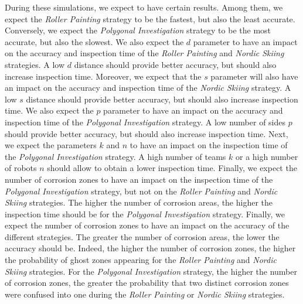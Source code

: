 During these simulations, we expect to have certain results.
Among them, we expect the \textit{Roller Painting} strategy to be the fastest, but also the least accurate.
Conversely, we expect the \textit{Polygonal Investigation} strategy to be the most accurate, but also the slowest.
We also expect the $d$ parameter to have an impact on the accuracy and inspection time of the \textit{Roller Painting} and \textit{Nordic Skiing} strategies.
A low $d$ distance should provide better accuracy, but should also increase inspection time.
Moreover, we expect that the $s$ parameter will also have an impact on the accuracy and inspection time of the \textit{Nordic Skiing} strategy.
A low $s$ distance should provide better accuracy, but should also increase inspection time.
We also expect the $p$ parameter to have an impact on the accuracy and inspection time of the \textit{Polygonal Investigation} strategy.
A low number of sides $p$ should provide better accuracy, but should also increase inspection time.
Next, we expect the parameters $k$ and $n$ to have an impact on the inspection time of the \textit{Polygonal Investigation} strategy.
A high number of teams $k$ or a high number of robots $n$ should allow to obtain a lower inspection time.
Finally, we expect the number of corrosion zones to have an impact on the inspection time of the \textit{Polygonal Investigation} strategy, but not on the \textit{Roller Painting} and \textit{Nordic Skiing} strategies.
The higher the number of corrosion areas, the higher the inspection time should be for the \textit{Polygonal Investigation} strategy.
Finally, we expect the number of corrosion zones to have an impact on the accuracy of the different strategies.
The greater the number of corrosion areas, the lower the accuracy should be.
Indeed, the higher the number of corrosion zones, the higher the probability of ghost zones appearing for the \textit{Roller Painting} and \textit{Nordic Skiing} strategies.
For the \textit{Polygonal Investigation} strategy, the higher the number of corrosion zones, the greater the probability that two distinct corrosion zones were confused into one during the \textit{Roller Painting} or \textit{Nordic Skiing} strategies.

